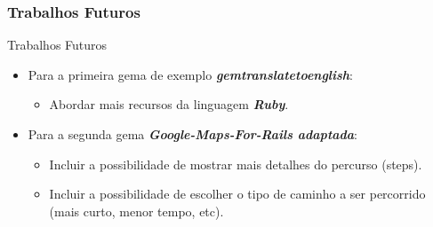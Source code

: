 \begin{frame}
\frametitle{Trabalhos Futuros}

  \begin{block}{Trabalhos Futuros}

   \begin{itemize}

    \item Para a primeira gema de exemplo \emph{\textbf{gemtranslatetoenglish}}:

    \begin{itemize}

     \item Abordar mais recursos da linguagem \emph{\textbf{Ruby}}.     

    \end{itemize}

    \item Para a segunda gema \emph{\textbf{Google-Maps-For-Rails adaptada}}:

    \begin{itemize}
     
     \item Incluir a possibilidade de mostrar mais detalhes do percurso (steps).

     \item Incluir a possibilidade de escolher o tipo de caminho a ser percorrido
     (mais curto, menor tempo, etc).

    \end{itemize}


   \end{itemize}

  \end{block}

\end{frame}


